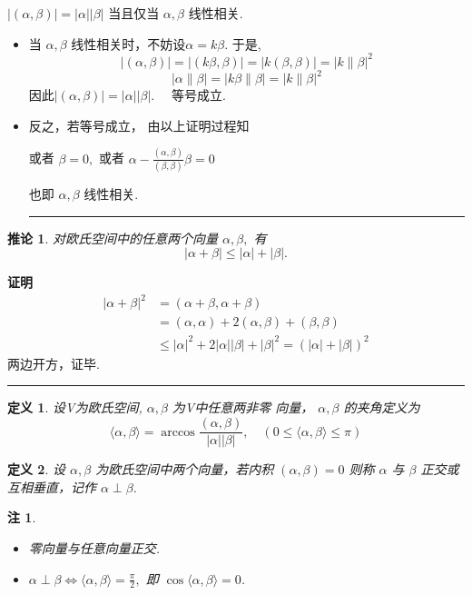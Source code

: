 \documentclass[13pt]{beamer}
\newtheorem*{defi}{定义}
\newtheorem*{coro}{推论}
\newtheorem*{rem}{注}
\def\qed{\nopagebreak\hfill{\rule{4pt}{7pt}}\medbreak}
\def\pf{{\bf 证明~~ }}
\def\0{{0}}
\begin{document}
\begin{frame}
\begin{center}
$| \left(\alpha, \beta \right) | = |\alpha|    | \beta|
$
当且仅当 $\alpha, \beta$ 线性相关.
\end{center}


\begin{itemize}
\item 
当
$\alpha, \beta$ 线性相关时，不妨设$\alpha=k \beta$.
于是, $$|(\alpha, \beta)|=|(k \beta, \beta)|=|k(\beta, \beta)|=|k \| {\beta}|^{2}$$
$$
|\alpha\|\beta|=| k \beta\| \beta|=|k \| \beta|^{2}
$$
因此$|(\alpha, \beta)|=|\alpha||\beta| . \quad$ 等号成立.

\item 
反之，若等号成立，
由以上证明过程知

或者 $\beta=\0,$ 或者 $\alpha-\frac{(\alpha, \beta)}{(\beta, \beta)} \beta=0$

也即 $\alpha, \beta$ 线性相关.
\qed
\end{itemize}
\end{frame}


\begin{frame}
\begin{coro}
对欧氏空间中的任意两个向量 $\alpha, \beta,$ 有
$$|\alpha+\beta| \leq|\alpha|+|\beta|. $$
\end{coro}
\pf 
\[
\begin{aligned}
|\alpha+\beta|^{2}& =(\alpha+\beta, \alpha+\beta) \\
\quad& =(\alpha, \alpha)+2(\alpha, \beta)+(\beta, \beta) \\
\quad & \leq|\alpha|^{2}+2|\alpha||\beta|+|\beta|^{2}=(|\alpha|+|\beta|)^{2}
\end{aligned}
\]
两边开方，证毕.
\qed
\end{frame}




\begin{frame}
\begin{defi}
	设V为欧氏空间, $\alpha, \beta$ 为V中任意两非零
向量， 
$\alpha, \beta$ 的夹角定义为
\[
\langle\alpha, \beta\rangle=\arccos \frac{(\alpha, \beta)}{|\alpha||\beta|},
\quad
(0 \leq\langle\alpha, \beta\rangle \leq \pi)
\]
\end{defi}
%
\begin{defi}
	设 $\alpha, \beta$ 为欧氏空间中两个向量，若内积
$
(\alpha, \beta)=0
$
则称 $\alpha$ 与 $\beta$ 正交或互相垂直，记作 $\alpha \perp \beta$.
\end{defi}
\begin{rem}
	\begin{itemize}
		\item 零向量与任意向量正交.
		 \item $\alpha \perp \beta \Longleftrightarrow\langle\alpha, \beta\rangle=\frac{\pi}{2},$ 即 $\cos \langle\alpha, \beta\rangle=0$.
	\end{itemize}
\end{rem}

\end{frame}
\end{document}
